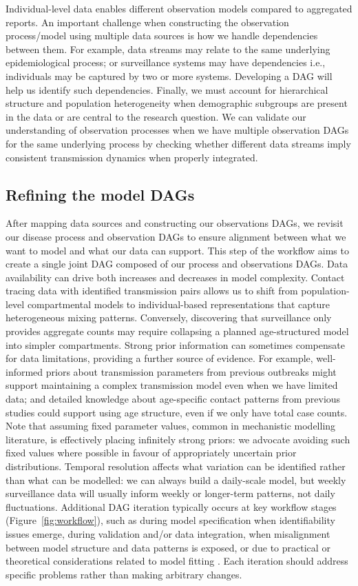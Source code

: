 \documentclass{article}
\begin{document}
Individual-level data enables different observation models compared to aggregated reports.
An important challenge when constructing the observation process/model using multiple data sources is how we handle dependencies between them. For example, data streams may relate to the same underlying epidemiological process; or surveillance systems may have dependencies i.e., individuals may be captured by two or more systems. Developing a DAG will help us identify such dependencies.
Finally, we must account for hierarchical structure and population heterogeneity when demographic subgroups are present in the data or are central to the research question. We can validate our understanding of observation processes when we have multiple observation DAGs for the same underlying process by checking whether different data streams imply consistent transmission dynamics when properly integrated.

\subsection{Refining the model DAGs} \label{sec:refine-dags}

After mapping data sources and constructing our observations DAGs, we revisit our disease process and observation DAGs to ensure alignment between what we want to model and what our data can support.
This step of the workflow aims to create a single joint DAG composed of our process and observations DAGs.
Data availability can drive both increases and decreases in model complexity.
Contact tracing data with identified transmission pairs allows us to shift from population-level compartmental models to individual-based representations that capture heterogeneous mixing patterns.
Conversely, discovering that surveillance only provides aggregate counts may require collapsing a planned age-structured model into simpler compartments.
Strong prior information can sometimes compensate for data limitations, providing a further source of evidence.
For example, well-informed priors about transmission parameters from previous outbreaks might support maintaining a complex transmission model even when we have limited data; and detailed knowledge about age-specific contact patterns from previous studies could support using age structure, even if we only have total case counts.
Note that assuming fixed parameter values, common in mechanistic modelling literature, is effectively placing infinitely strong priors: we advocate avoiding such fixed values where possible in favour of appropriately uncertain prior distributions.
Temporal resolution affects what variation can be identified rather than what can be modelled: we can always build a daily-scale model, but weekly surveillance data will usually inform weekly or longer-term patterns, not daily fluctuations.
Additional DAG iteration typically occurs at key workflow stages (Figure~\ref{fig:workflow}), such as during model specification when identifiability issues emerge, during validation and/or data integration, when misalignment between model structure and data patterns is exposed, or due to practical or theoretical considerations related to model fitting \citep{corbella2022inferring}.
Each iteration should address specific problems rather than making arbitrary changes.
\end{document}
